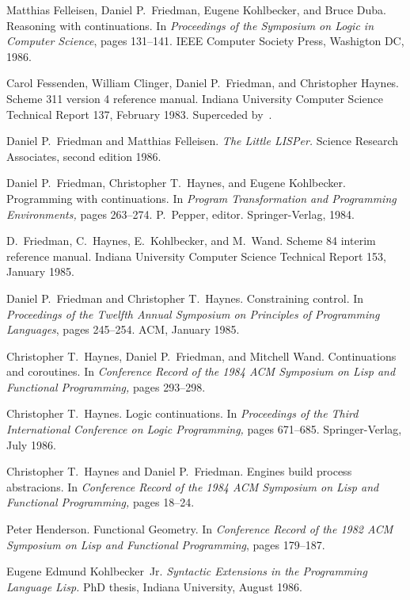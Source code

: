 \begin{thebibliography}{99}
Matthias Felleisen, Daniel P.~Friedman, Eugene Kohlbecker, and Bruce Duba.
Reasoning with continuations.
In {\em Proceedings of the Symposium on Logic in Computer Science},
  pages 131--141.
IEEE Computer Society Press, Washigton DC, 1986.

Carol Fessenden, William Clinger, Daniel P.~Friedman, and Christopher Haynes.
Scheme 311 version 4 reference manual.
Indiana University Computer Science Technical Report 137, February 1983.
Superceded by~\cite{Scheme84}.

Daniel P.~Friedman and Matthias Felleisen.
{\em The Little LISPer.}
Science Research Associates, second edition 1986.

Daniel P.~Friedman, Christopher T.~Haynes, and Eugene Kohlbecker.
Programming with continuations.
In {\em Program Transformation and Programming Environments,\/}
  pages 263--274.
P.~Pepper, editor.
Springer-Verlag, 1984.

D.~Friedman, C.~Haynes, E.~Kohlbecker, and M.~Wand.
Scheme 84 interim reference manual.
Indiana University Computer Science Technical Report 153, January 1985.

Daniel P.~Friedman and Christopher T.~Haynes.
Constraining control.
In {\em Proceedings of the Twelfth Annual Symposium on Principles of
  Programming Languages}, pages 245--254.
ACM, January 1985.

Christopher T.~Haynes, Daniel P.~Friedman, and Mitchell Wand.
Continuations and coroutines.
In {\em Conference Record of the 1984 ACM Symposium on Lisp and
  Functional Programming,} pages 293--298.

Christopher T.~Haynes.
Logic continuations. 
In {\em Proceedings of the Third International Conference on
  Logic Programming,\/} pages 671--685.
Springer-Verlag, July 1986.

Christopher T.~Haynes and Daniel P.~Friedman.
Engines build process abstracions.
In {\em Conference Record of the 1984 ACM Symposium on Lisp and
  Functional Programming,\/} pages 18--24.

Peter Henderson.  Functional Geometry.
In {\em Conference Record of the 1982 ACM Symposium on Lisp and
  Functional Programming}, pages 179--187.

Eugene Edmund Kohlbecker~Jr.
{\em Syntactic Extensions in the Programming Language Lisp.}
PhD thesis, Indiana University, August 1986.


\end{thebibliography}
